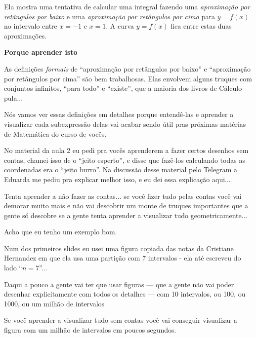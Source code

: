 \documentclass[oneside,12pt]{article}
\begin{document}
Ela mostra uma tentativa de calcular uma integral fazendo uma {\sl
  aproximação por retângulos por baixo} e uma {\sl aproximação por
  retângulos por cima} para $y=f(x)$ no intervalo entre $x=-1$ e
$x=1$. A curva $y=f(x)$ fica entre estas duas aproximações.

\newpage


{\bf Porque aprender isto}

\ssk

As definições {\sl formais} de ``aproximação por retângulos por
baixo'' e ``aproximação por retângulos por cima'' são bem trabalhosas.
Elas envolvem alguns truques com conjuntos infinitos, ``para todo'' e
``existe'', que a maioria dos livros de Cálculo pula...

Nós vamos ver essas definições em detalhes porque entendê-las e
aprender a visualizar cada subexpressão delas vai acabar sendo
 útil pras próximas matérias de Matemática do curso de
vocês.

No material da aula 2 eu pedi pra vocês aprenderem a fazer certos
desenhos sem contas, chamei isso de o ``jeito esperto'', e disse que
fazê-los calculando todas as coordenadas era o ``jeito burro''. Na
discussão desse material pelo Telegram a Eduarda me pediu pra explicar
melhor isso, e eu dei essa explicação aqui...

\newpage


Tenta aprender a não fazer as contas... se você fizer tudo pelas
contas você vai demorar muito mais e não vai descobrir um monte de
truques importantes que a gente só descobre se a gente tenta aprender
a visualizar tudo geometricamente...

Acho que eu tenho um exemplo bom.

Num dos primeiros slides eu usei uma figura copiada das notas da
Cristiane Hernandez em que ela usa uma partição com 7 intervalos - ela
até escreveu do lado ``$n=7$''...

Daqui a pouco a gente vai ter que usar figuras --- que a gente não vai
poder desenhar explicitamente com todos os detalhes --- com 10
intervalos, ou 100, ou 1000, ou um milhão de intervalos

Se você aprender a visualizar tudo sem contas você vai conseguir
visualizar a figura com um milhão de intervalos em poucos segundos.
\end{document}
